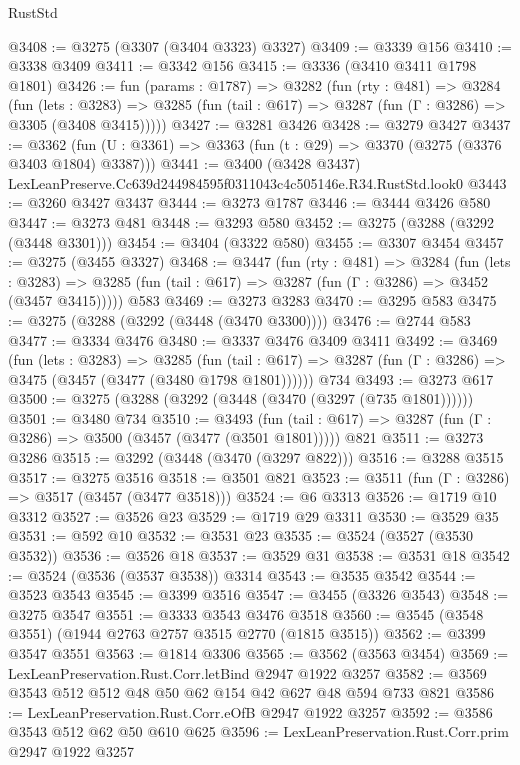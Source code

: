 \begin{lexlean}{RustStd}
\begin{coremodule}
@3408 := @3275 (@3307 (@3404 @3323) @3327)
@3409 := @3339 @156
@3410 := @3338 @3409
@3411 := @3342 @156
@3415 := @3336 (@3410 @3411 @1798 @1801)
@3426 := fun (params : @1787) =>
  @3282
    (fun (rty : @481) =>
    @3284
      (fun (lets : @3283) =>
      @3285 (fun (tail : @617) => @3287 (fun (Γ : @3286) => @3305 (@3408 @3415)))))
@3427 := @3281 @3426
@3428 := @3279 @3427
@3437 := @3362 (fun (U : @3361) => @3363 (fun (t : @29) => @3370 (@3275 (@3376 @3403 @1804) @3387)))
@3441 := @3400 (@3428 @3437) LexLeanPreserve.Cc639d244984595f0311043c4c505146e.R34.RustStd.look0
@3443 := @3260 @3427 @3437
@3444 := @3273 @1787
@3446 := @3444 @3426 @580
@3447 := @3273 @481
@3448 := @3293 @580
@3452 := @3275 (@3288 (@3292 (@3448 @3301)))
@3454 := @3404 (@3322 @580)
@3455 := @3307 @3454
@3457 := @3275 (@3455 @3327)
@3468 := @3447
    (fun (rty : @481) =>
    @3284
      (fun (lets : @3283) =>
      @3285 (fun (tail : @617) => @3287 (fun (Γ : @3286) => @3452 (@3457 @3415)))))
    @583
@3469 := @3273 @3283
@3470 := @3295 @583
@3475 := @3275 (@3288 (@3292 (@3448 (@3470 @3300))))
@3476 := @2744 @583
@3477 := @3334 @3476
@3480 := @3337 @3476 @3409 @3411
@3492 := @3469
    (fun (lets : @3283) =>
    @3285
      (fun (tail : @617) => @3287 (fun (Γ : @3286) => @3475 (@3457 (@3477 (@3480 @1798 @1801))))))
    @734
@3493 := @3273 @617
@3500 := @3275 (@3288 (@3292 (@3448 (@3470 (@3297 (@735 @1801))))))
@3501 := @3480 @734
@3510 := @3493
    (fun (tail : @617) => @3287 (fun (Γ : @3286) => @3500 (@3457 (@3477 (@3501 @1801)))))
    @821
@3511 := @3273 @3286
@3515 := @3292 (@3448 (@3470 (@3297 @822)))
@3516 := @3288 @3515
@3517 := @3275 @3516
@3518 := @3501 @821
@3523 := @3511 (fun (Γ : @3286) => @3517 (@3457 (@3477 @3518)))
@3524 := @6 @3313
@3526 := @1719 @10 @3312
@3527 := @3526 @23
@3529 := @1719 @29 @3311
@3530 := @3529 @35
@3531 := @592 @10
@3532 := @3531 @23
@3535 := @3524 (@3527 (@3530 @3532))
@3536 := @3526 @18
@3537 := @3529 @31
@3538 := @3531 @18
@3542 := @3524 (@3536 (@3537 @3538)) @3314
@3543 := @3535 @3542
@3544 := @3523 @3543
@3545 := @3399 @3516
@3547 := @3455 (@3326 @3543)
@3548 := @3275 @3547
@3551 := @3333 @3543 @3476 @3518
@3560 := @3545 (@3548 @3551) (@1944 @2763 @2757 @3515 @2770 (@1815 @3515))
@3562 := @3399 @3547 @3551
@3563 := @1814 @3306
@3565 := @3562 (@3563 @3454)
@3569 := LexLeanPreservation.Rust.Corr.letBind @2947 @1922 @3257
@3582 := @3569 @3543 @512 @512 @48 @50 @62 @154 @42 @627 @48 @594 @733 @821
@3586 := LexLeanPreservation.Rust.Corr.eOfB @2947 @1922 @3257
@3592 := @3586 @3543 @512 @62 @50 @610 @625
@3596 := LexLeanPreservation.Rust.Corr.prim @2947 @1922 @3257

\end{coremodule}
\end{lexlean}
